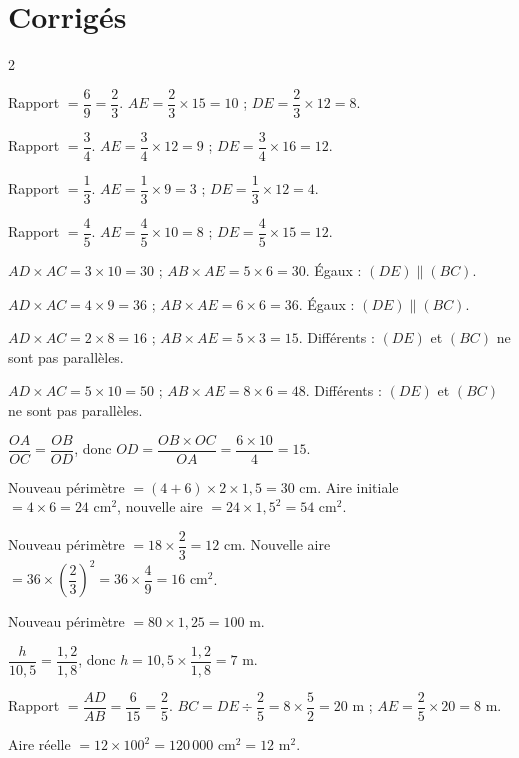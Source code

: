 \section{Corrigés}
\begin{multicols}{2}

Rapport $=\dfrac69=\dfrac23$. $AE=\dfrac23\times15=10$ ; $DE=\dfrac23\times12=8$.

Rapport $=\dfrac34$. $AE=\dfrac34\times12=9$ ; $DE=\dfrac34\times16=12$.

Rapport $=\dfrac13$. $AE=\dfrac13\times9=3$ ; $DE=\dfrac13\times12=4$.

Rapport $=\dfrac45$. $AE=\dfrac45\times10=8$ ; $DE=\dfrac45\times15=12$.

$AD\times AC=3\times10=30$ ; $AB\times AE=5\times6=30$. Égaux : $(DE)\parallel(BC)$.

$AD\times AC=4\times9=36$ ; $AB\times AE=6\times6=36$. Égaux : $(DE)\parallel(BC)$.

$AD\times AC=2\times8=16$ ; $AB\times AE=5\times3=15$. Différents : $(DE)$ et $(BC)$ ne sont
pas parallèles.

$AD\times AC=5\times10=50$ ; $AB\times AE=8\times6=48$. Différents : $(DE)$ et $(BC)$ ne
sont pas parallèles.

$\dfrac{OA}{OC}=\dfrac{OB}{OD}$, donc $OD=\dfrac{OB\times OC}{OA}=\dfrac{6\times10}4=15$.

Nouveau périmètre $=(4+6)\times2\times1{,}5=30$ cm. Aire initiale $=4\times6=24\text{ cm}^2$,
nouvelle aire $=24\times1{,}5^{2}=54\text{ cm}^2$.

Nouveau périmètre $=18\times\dfrac23=12$ cm. Nouvelle aire $=36\times\left(\dfrac23\right)^{2}=36\times\dfrac49=16\text{ cm}^2$.

Nouveau périmètre $=80\times1{,}25=100$ m.

$\dfrac{h}{10{,}5}=\dfrac{1{,}2}{1{,}8}$, donc $h=10{,}5\times\dfrac{1{,}2}{1{,}8}=7$ m.

Rapport $=\dfrac{AD}{AB}=\dfrac6{15}=\dfrac25$. $BC=DE\div\dfrac25=8\times\dfrac52=20$ m ;
$AE=\dfrac25\times20=8$ m.

Aire réelle $=12\times100^{2}=120\,000\text{ cm}^2=12\text{ m}^2$.


\end{multicols}
